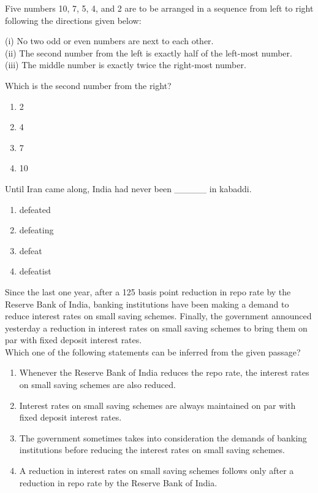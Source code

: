     \item Five numbers 10, 7, 5, 4, and 2 are to be arranged in a sequence from left to right following the directions given below:
   
        (i) No two odd or even numbers are next to each other.\\
        (ii) The second number from the left is exactly half of the left-most number.\\
        (iii) The middle number is exactly twice the right-most number.
  
    Which is the second number from the right?
    \begin{enumerate}
        \item 2
        \item 4
        \item 7
        \item 10
    \end{enumerate}
    
    \item Until Iran came along, India had never been \_\_\_\_\_ in kabaddi.
    \begin{enumerate}
        \item defeated
        \item defeating
        \item defeat
        \item defeatist
    \end{enumerate}


\item Since the last one year, after a 125 basis point reduction in repo rate by the Reserve Bank of India, banking institutions have been making a demand to reduce interest rates on small saving schemes. Finally, the government announced yesterday a reduction in interest rates on small saving schemes to bring them on par with fixed deposit interest rates. \\
    Which one of the following statements can be inferred from the given passage?
    \begin{enumerate}
        \item Whenever the Reserve Bank of India reduces the repo rate, the interest rates on small saving schemes are also reduced.
        \item Interest rates on small saving schemes are always maintained on par with fixed deposit interest rates.
        \item The government sometimes takes into consideration the demands of banking institutions before reducing the interest rates on small saving schemes.
        \item A reduction in interest rates on small saving schemes follows only after a reduction in repo rate by the Reserve Bank of India.
    \end{enumerate}
    
